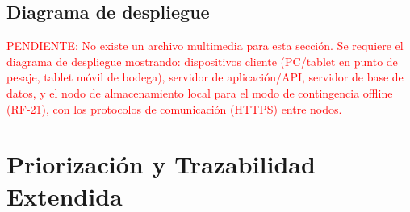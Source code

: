 \documentclass[11pt,a4paper]{article}
\begin{document}
\subsection{Diagrama de despliegue}
\textcolor{red}{PENDIENTE: No existe un archivo multimedia para esta sección. Se requiere el diagrama de despliegue mostrando: dispositivos cliente (PC/tablet en punto de pesaje, tablet móvil de bodega), servidor de aplicación/API, servidor de base de datos, y el nodo de almacenamiento local para el modo de contingencia offline (RF-21), con los protocolos de comunicación (HTTPS) entre nodos.}

\section{Priorización y Trazabilidad Extendida}
\end{document}
